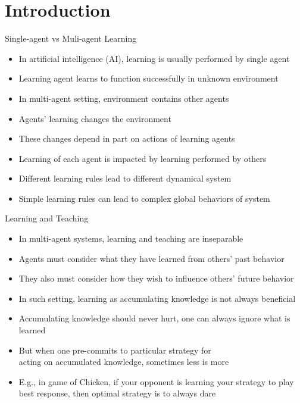 \documentclass[11pt,aspectratio=169,handout]{beamer}
\subtitle{\vspace{2.1em}Lecture 9: Learning in Games}
\begin{document}
 \begin{frame}[plain]
  \titlepage
 \end{frame} 
 
 \section{Introduction}
 
  \begin{frame}{Single-agent vs Muli-agent Learning}
   \begin{itemize}[<+->]
   \setlength{\itemsep}{0.7em}
    \item In artificial intelligence (AI), learning is usually performed by \alert{single agent}
    \item Learning agent learns to function successfully in \alert{unknown environment}
    \item In multi-agent setting, environment contains other agents
    \item Agents' learning changes the environment
    \item These changes \alert{depend} in part on actions of learning agents
    \item Learning of each agent is \alert{impacted} by learning performed by others
    \item Different learning rules lead to different \alert{dynamical system}
    \item Simple learning rules can lead to complex global behaviors of system
   \end{itemize}
  \end{frame}
  
  
  \begin{frame}{Learning and Teaching}
   \begin{itemize}[<+->]
   \setlength{\itemsep}{0.5em}
    \item In multi-agent systems, learning and teaching are inseparable
    \item Agents must consider what they have \alert{learned} from others' past behavior
    \item They also must consider how they wish to \alert{influence} others' future behavior
    \item In such setting, learning as \alert{accumulating knowledge} is not always beneficial
    \item Accumulating knowledge should never hurt, one can always ignore what is learned
    \item But when one pre-commits to particular strategy for \\acting on accumulated knowledge, sometimes less is more
    \item E.g., in game of Chicken, if your opponent is learning your strategy to play best response, then optimal strategy is to always dare
   \end{itemize}
  \end{frame}
  
\end{document}
